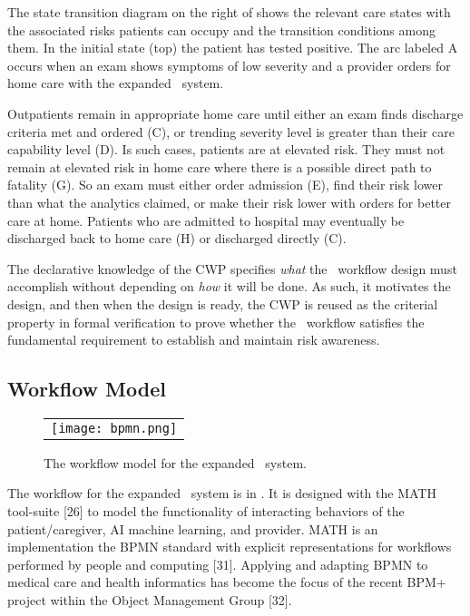 The state transition diagram on the right of  shows the relevant care states with the associated risks patients can occupy and the transition conditions among them. In the initial state (top) the patient has tested positive. The arc labeled A occurs when an exam shows symptoms of low severity and a provider orders for home care with the expanded \phware\ system. 

Outpatients remain in appropriate home care until either an exam finds discharge criteria met and ordered (C), or trending severity level is greater than their care capability level (D). Is such cases, patients are at elevated risk. They must not remain at elevated risk in home care where there is a possible direct path to fatality (G). So an exam must either order admission (E), find their risk lower than what the analytics claimed, or make their risk lower with orders for better care at home. Patients who are admitted to hospital may eventually be discharged back to home care (H) or discharged directly (C). 

The declarative knowledge of the CWP specifies \emph{what} the \phware\ workflow design must accomplish without depending on \emph{how} it will be done. As such, it motivates the design, and then when the design is ready, the CWP is reused as the criterial property in formal verification to prove whether the \phware\ workflow satisfies the fundamental requirement to establish and maintain risk awareness. 

\subsection{Workflow Model}
\begin{figure*}
  \begin{center}
    \begin{tabular}{c}
      \texttt{[image: bpmn.png]}
    \end{tabular}
  \end{center}
\caption{The workflow model for the expanded \phware\ system.}
\label{fig:bpmn}
\end{figure*}

The workflow for the expanded \phware\ system is in . It is designed with the MATH tool-suite [26] to model the functionality of interacting behaviors of the patient/caregiver, AI machine learning, and provider. MATH is an implementation the BPMN standard with explicit representations for workflows performed by people and computing [31]. Applying and adapting BPMN to medical care and health informatics has become the focus of the recent BPM+ project within the Object Management Group [32]. 

